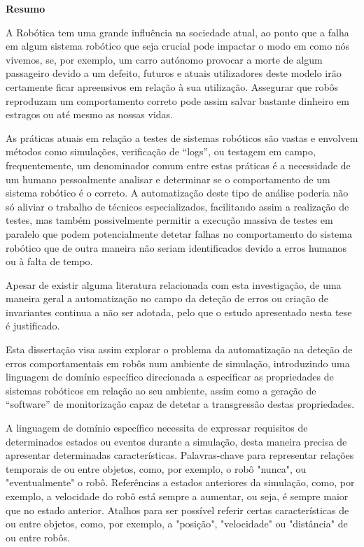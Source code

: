 
\vspace*{2cm}
\begin{center} \Large \bf Resumo
\end{center}
\vspace*{1cm} \setlength{\baselineskip}{0.6cm}

A Robótica tem uma grande influência na sociedade atual, ao ponto que a falha em algum sistema robótico que seja crucial pode impactar o modo em como nós vivemos, se, por exemplo, um carro autónomo provocar a morte de algum passageiro devido a um defeito, futuros e atuais utilizadores deste modelo irão certamente ficar apreensivos em relação à sua utilização. Assegurar que robôs reproduzam um comportamento correto pode assim salvar bastante dinheiro em estragos ou até mesmo as nossas vidas.

As práticas atuais em relação a testes de sistemas robóticos são vastas e envolvem métodos como simulações, verificação de “logs”, ou testagem em campo, frequentemente, um denominador comum entre estas práticas é a necessidade de um humano pessoalmente analisar e determinar se o comportamento de um sistema robótico é o correto. A automatização deste tipo de análise poderia não só aliviar o trabalho de técnicos especializados, facilitando assim a realização de testes, mas também possivelmente permitir a execução massiva de testes em paralelo que podem potencialmente detetar falhas no comportamento do sistema robótico que de outra maneira não seriam identificados devido a erros humanos ou à falta de tempo.

Apesar de existir alguma literatura relacionada com esta investigação, de uma maneira geral a automatização no campo da deteção de erros ou criação de invariantes continua a não ser adotada, pelo que o estudo apresentado nesta tese é justificado. 

Esta dissertação visa assim explorar o problema da automatização na deteção de erros comportamentais em robôs num ambiente de simulação, introduzindo uma linguagem de domínio específico direcionada a especificar as propriedades de sistemas robóticos em relação ao seu ambiente, assim como a geração de “software” de monitorização capaz de detetar a transgressão destas propriedades.

A linguagem de domínio específico necessita de expressar requisitos de determinados estados ou eventos durante a simulação, desta maneira precisa de apresentar determinadas características. Palavras-chave para representar relações temporais de ou entre objetos, como, por exemplo, o robô "nunca", ou "eventualmente" o robô. Referências a estados anteriores da simulação, como, por exemplo, a velocidade do robô está sempre a aumentar, ou seja, é sempre maior que no estado anterior. Atalhos para ser possível referir certas características de ou entre objetos, como, por exemplo, a "posição", "velocidade" ou "distância" de ou entre robôs.

